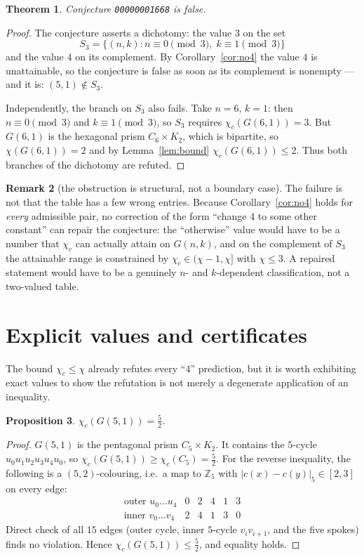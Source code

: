 \documentclass[11pt]{article}
\newtheorem{theorem}{Theorem}
\newtheorem{proposition}[theorem]{Proposition}
\theoremstyle{definition}
\newtheorem{remark}[theorem]{Remark}
\newcommand{\chic}{\chi_c}
\newcommand{\Gn}{G(n,k)}
\begin{document}
\begin{theorem}\label{thm:main}
Conjecture \texttt{00000001668} is false.
\end{theorem}

\begin{proof}
The conjecture asserts a dichotomy: the value $3$ on the set
\[
S_3 = \{(n,k) : n \equiv 0 \!\!\pmod 3,\; k \equiv 1 \!\!\pmod 3\}
\]
and the value $4$ on its complement. By Corollary~\ref{cor:no4} the value $4$
is unattainable, so the conjecture is false as soon as its complement is
nonempty --- and it is: $(5,1) \notin S_3$.

Independently, the branch on $S_3$ also fails. Take $n = 6$, $k = 1$:
then $n \equiv 0 \pmod 3$ and $k \equiv 1 \pmod 3$, so $S_3$ requires
$\chic(G(6,1)) = 3$. But $G(6,1)$ is the hexagonal prism $C_6 \times K_2$,
which is bipartite, so $\chi(G(6,1)) = 2$ and by Lemma~\ref{lem:bound}
$\chic(G(6,1)) \le 2$. Thus both branches of the dichotomy are refuted.
\end{proof}

\begin{remark}[the obstruction is structural, not a boundary case]
The failure is not that the table has a few wrong entries. Because
Corollary~\ref{cor:no4} holds for \emph{every} admissible pair, no correction
of the form ``change $4$ to some other constant'' can repair the conjecture:
the ``otherwise'' value would have to be a number that $\chic$ can actually
attain on $\Gn$, and on the complement of $S_3$ the attainable range is
constrained by $\chic \in (\chi - 1, \chi]$ with $\chi \le 3$. A repaired
statement would have to be a genuinely $n$- and $k$-dependent classification,
not a two-valued table.
\end{remark}

\section{Explicit values and certificates}

The bound $\chic \le \chi$ already refutes every ``$4$'' prediction, but it is
worth exhibiting exact values to show the refutation is not merely a
degenerate application of an inequality.

\begin{proposition}\label{prop:penta}
$\chic(G(5,1)) = \tfrac{5}{2}$.
\end{proposition}

\begin{proof}
$G(5,1)$ is the pentagonal prism $C_5 \times K_2$. It contains the $5$-cycle
$u_0 u_1 u_2 u_3 u_4 u_0$, so $\chic(G(5,1)) \ge \chic(C_5) = \tfrac52$. For
the reverse inequality, the following is a $(5,2)$-colouring, i.e.\ a map to
$\mathbb{Z}_5$ with $|c(x) - c(y)|_5 \in [2, 3]$ on every edge:
\[
\begin{array}{lcccccc}
\text{outer } u_0 \dots u_4 & 0 & 2 & 4 & 1 & 3\\
\text{inner } v_0 \dots v_4 & 2 & 4 & 1 & 3 & 0
\end{array}
\]
Direct check of all $15$ edges (outer cycle, inner $5$-cycle $v_i v_{i+1}$,
and the five spokes) finds no violation. Hence $\chic(G(5,1)) \le \tfrac52$,
and equality holds.
\end{proof}
\end{document}
